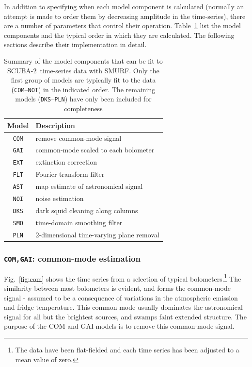 \documentclass[useAMS,usenatbib,nofootinbib]{mn2e}
\newcommand{\scuba}{SCUBA-2}
\begin{document}
In addition to specifying when each model component is calculated
(normally an attempt is made to order them by decreasing amplitude in
the time-series), there are a number of parameters that control their
operation. Table~\ref{tab:components} list the model components and
the typical order in which they are calculated. The following sections
describe their implementation in detail.

\begin{table}
  \caption{Summary of the model components that can be fit to
    \scuba\ time-series data with SMURF. Only the first group of
    models are typically fit to the data (\texttt{COM}--\texttt{NOI})
    in the indicated order. The remaining models
    (\texttt{DKS}--\texttt{PLN}) have only been included for
    completeness}
  \vspace{0.2cm}
  \centering
  \begin{tabular}{c|l}
    \hline
    Model & Description \\
    \hline
    \texttt{COM} & remove common-mode signal \\
    \texttt{GAI} & common-mode scaled to each bolometer \\
    \texttt{EXT} & extinction correction \\
    \texttt{FLT} & Fourier transform filter \\
    \texttt{AST} & map estimate of astronomical signal \\
    \texttt{NOI} & noise estimation \\
    \hline
    \texttt{DKS} & dark squid cleaning along columns \\
    \texttt{SMO} & time-domain smoothing filter \\
    \texttt{PLN} & 2-dimensional time-varying plane removal \\
    \hline
    \end{tabular}
  \label{tab:components}
\end{table}

\subsubsection{\texttt{COM,GAI}: common-mode estimation}
\label{sec:comgai}

﻿Fig.~\ref{fig:com} shows the time series from a selection of typical
bolometers.\footnote{The data have been flat-fielded and each time series
has been adjusted to a mean value of zero.} The similarity between most
bolometers is evident, and forms the common-mode signal - assumed to be a
consequence of variations in the atmospheric emission and fridge
temperature. This common-mode usually dominates the astronomical signal
for all but the brightest sources, and swamps faint extended structure.
The purpose of the COM and GAI models is to remove this common-mode
signal.
\end{document}
